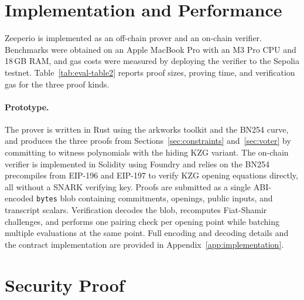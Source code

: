 



\section{Implementation and Performance}
Zeeperio is implemented as an off-chain prover and an on-chain verifier.
Benchmarks were obtained on an Apple MacBook Pro with an M3 Pro CPU and 18\,GB RAM, and gas costs were
measured by deploying the verifier to the Sepolia testnet.
Table~\ref{tab:eval-table2} reports proof sizes, proving time, and verification gas for the three proof kinds.\footnotemark
{}



\paragraph{Prototype.}
The prover is written in Rust using the arkworks toolkit and the BN254 curve, and produces the three proofs from Sections~\ref{sec:constraints} and~\ref{sec:voter} by committing to witness polynomials
with the hiding KZG variant.
The on-chain verifier is implemented in Solidity using Foundry and relies on the BN254 precompiles from
EIP-196 and EIP-197 to verify KZG opening equations directly, all without a SNARK verifying key.
Proofs are submitted as a single ABI-encoded \texttt{bytes} blob containing commitments, openings, public inputs,
and transcript scalars. Verification decodes the blob, recomputes Fiat-Shamir challenges, and performs one
pairing check per opening point while batching multiple evaluations at the same point.
Full encoding and decoding details and the contract implementation are provided in Appendix~\ref{app:implementation}.

\section{Security Proof}
\label{sec:security}

 

